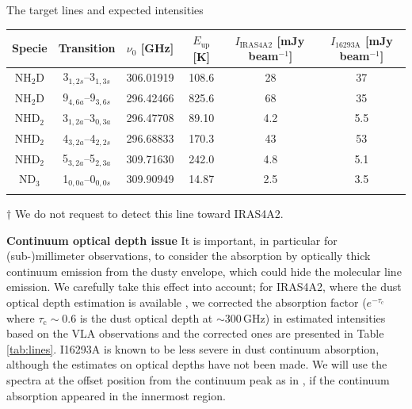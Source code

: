 \documentclass[12pt,a4paper]{article}  %
\begin{document}
\begin{center}
\begin{threeparttable}[tbh]
\caption[]{The target lines and expected intensities}
\begin{tabular}{cccccc}
\hline \noalign {\smallskip}
Specie & Transition & $\nu_0$ [GHz] & $E_\mathrm{up}$ [K] & $I_\mathrm{IRAS4A2}$ [mJy\,beam$^{-1}$] & $I_\mathrm{16293A}$ [mJy beam$^{-1}$] \\
\hline \noalign {\smallskip}
NH$_2$D & 3$_{1,2s}$--3$_{1,3s}$ & 306.01919 & 108.6 & 28 & 37 \\
NH$_2$D & 9$_{4,6a}$--9$_{3,6s}$ & 296.42466 & 825.6 & 68 & 35 \\
NHD$_2$ & 3$_{1,2a}$--3$_{0,3a}$ & 296.47708 & 89.10 & 4.2 & 5.5\\
NHD$_2$ & 4$_{3,2a}$--4$_{2,2s}$ & 296.68833 & 170.3 & 43 & 53\\
NHD$_2$ & 5$_{3,2a}$--5$_{2,3a}$ & 309.71630 & 242.0 & 4.8 & 5.1\\
ND$_3$ & 1$_{0,0a}$--0$_{0,0s}$ & 309.90949	& 14.87 & 2.5\tnote{$\dagger$} & 3.5 \\
\hline \noalign {\smallskip}
\end{tabular}
\begin{tablenotes}
\item[$\dagger$] We do not request to detect this line toward IRAS4A2.
\end{tablenotes}
\label{tab:lines}
\end{threeparttable}
\end{center}

\smallskip
\noindent \textbf{Continuum optical depth issue} \quad It is important, in particular for (sub-)millimeter observations, to consider the absorption by optically thick continuum emission from the dusty envelope, which could hide the molecular line emission. We carefully take this effect into account; for IRAS4A2, where the dust optical depth estimation is available \citep[][ with assuming opacity slope $\beta=1$]{DeSimone20}, we corrected the absorption factor ($e^{-\tau_\mathrm{c}}$ where $\tau_\mathrm{c}\sim0.6$ is the dust optical depth at $\sim$300\,GHz) in estimated intensities based on the VLA observations and the corrected ones are presented in Table \ref{tab:lines}. I16293A is known to be less severe in dust continuum absorption, although the estimates on optical depths have not been made. We will use the spectra at the offset position from the continuum peak as in \citet{Manigand20}, if the continuum absorption appeared in the innermost region.
\end{document}
